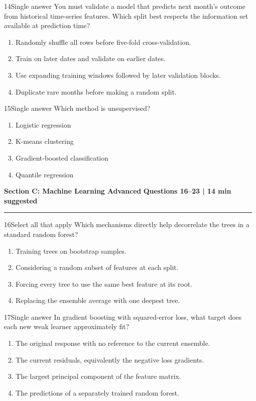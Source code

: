 \documentclass[10pt,a4paper]{article}
\newcommand{\sectionbanner}[2]{%
  \vspace{3mm}
  {\color{navy}\Large\bfseries #1}\hfill
  {\color{blue}\bfseries #2}
  \par\vspace{1mm}\color{line}\rule{\linewidth}{0.8pt}\color{ink}\vspace{2mm}
}
\begin{document}
\begin{questionbox}{14}{Single answer}
You must validate a model that predicts next month's outcome from historical time-series features. Which split best respects the information set available at prediction time?
\begin{enumerate}
  \item Randomly shuffle all rows before five-fold cross-validation.
  \item Train on later dates and validate on earlier dates.
  \item Use expanding training windows followed by later validation blocks.
  \item Duplicate rare months before making a random split.
\end{enumerate}
\end{questionbox}

\begin{questionbox}{15}{Single answer}
Which method is unsupervised?
\begin{enumerate}
  \item Logistic regression
  \item K-means clustering
  \item Gradient-boosted classification
  \item Quantile regression
\end{enumerate}
\end{questionbox}

\newpage
\sectionbanner{Section C: Machine Learning Advanced}{Questions 16--23 | 14 min suggested}

\begin{questionbox}{16}{Select all that apply}
Which mechanisms directly help decorrelate the trees in a standard random forest?
\begin{enumerate}
  \item Training trees on bootstrap samples.
  \item Considering a random subset of features at each split.
  \item Forcing every tree to use the same best feature at its root.
  \item Replacing the ensemble average with one deepest tree.
\end{enumerate}
\end{questionbox}

\begin{questionbox}{17}{Single answer}
In gradient boosting with squared-error loss, what target does each new weak learner approximately fit?
\begin{enumerate}
  \item The original response with no reference to the current ensemble.
  \item The current residuals, equivalently the negative loss gradients.
  \item The largest principal component of the feature matrix.
  \item The predictions of a separately trained random forest.
\end{enumerate}
\end{questionbox}
\end{document}
